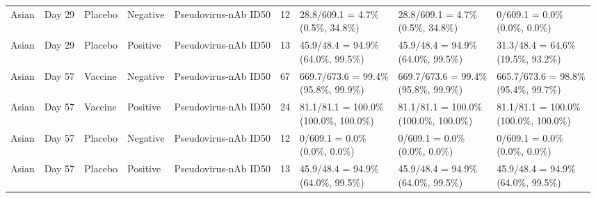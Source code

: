 \documentclass[]{book}
\theoremstyle{definition}
\theoremstyle{definition}
\theoremstyle{definition}
\newcommand{\1}{\mathbbm{1}}
\begin{document}
\begin{landscape}
\begin{ThreePartTable}
\begin{longtable}[t]{>{\raggedright\arraybackslash}p{2.7cm}llllllll}
\hspace{1em}Asian & Day 29 & Placebo & Negative & Pseudovirus-nAb ID50 & 12 & \makecell[l]{28.8/609.1 = 4.7\%\\(0.5\%, 34.8\%)} & \makecell[l]{28.8/609.1 = 4.7\%\\(0.5\%, 34.8\%)} & \makecell[l]{0/609.1 = 0.0\%\\(0.0\%, 0.0\%)}\\
\hspace{1em}Asian & Day 29 & Placebo & Positive & Pseudovirus-nAb ID50 & 13 & \makecell[l]{45.9/48.4 = 94.9\%\\(64.0\%, 99.5\%)} & \makecell[l]{45.9/48.4 = 94.9\%\\(64.0\%, 99.5\%)} & \makecell[l]{31.3/48.4 = 64.6\%\\(19.5\%, 93.2\%)}\\
\hspace{1em}Asian & Day 57 & Vaccine & Negative & Pseudovirus-nAb ID50 & 67 & \makecell[l]{669.7/673.6 = 99.4\%\\(95.8\%, 99.9\%)} & \makecell[l]{669.7/673.6 = 99.4\%\\(95.8\%, 99.9\%)} & \makecell[l]{665.7/673.6 = 98.8\%\\(95.4\%, 99.7\%)}\\
\hspace{1em}Asian & Day 57 & Vaccine & Positive & Pseudovirus-nAb ID50 & 24 & \makecell[l]{81.1/81.1 = 100.0\%\\(100.0\%, 100.0\%)} & \makecell[l]{81.1/81.1 = 100.0\%\\(100.0\%, 100.0\%)} & \makecell[l]{81.1/81.1 = 100.0\%\\(100.0\%, 100.0\%)}\\
\hspace{1em}Asian & Day 57 & Placebo & Negative & Pseudovirus-nAb ID50 & 12 & \makecell[l]{0/609.1 = 0.0\%\\(0.0\%, 0.0\%)} & \makecell[l]{0/609.1 = 0.0\%\\(0.0\%, 0.0\%)} & \makecell[l]{0/609.1 = 0.0\%\\(0.0\%, 0.0\%)}\\
\hspace{1em}Asian & Day 57 & Placebo & Positive & Pseudovirus-nAb ID50 & 13 & \makecell[l]{45.9/48.4 = 94.9\%\\(64.0\%, 99.5\%)} & \makecell[l]{45.9/48.4 = 94.9\%\\(64.0\%, 99.5\%)} & \makecell[l]{45.9/48.4 = 94.9\%\\(64.0\%, 99.5\%)}\\

\end{longtable}
\end{ThreePartTable}
\end{landscape}
\end{document}
